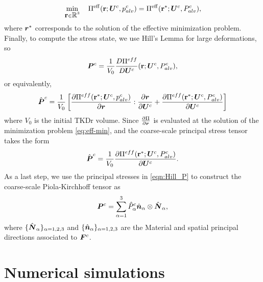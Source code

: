 \documentclass[preprint,3p,12pt,number,sort&compress]{elsarticle}
\newcommand{\pd}[2]{\frac{\partial #1}{ \partial #2}}   %
\def\mat   #1{\mbox{\bf #1}{}}
\def\vec   #1{\text{\boldmath $#1$}{}}
\def\ten   #1{\text{\boldmath $#1$}{}}
\def\R{\mbox{\(\mathbb{R}\)}}
\begin{document}
\begin{equation}
	\min \limits_{\mat r \in \R^{3}} \quad \Pi^{\rm eff} (\mat r; \ten U^c, p_{alv}^c)
	\label{eq:effmin} = \Pi^{\rm eff} (\mat r^*; \ten U^c, P_{alv}^c),
 \label{eq:eff-min}
\end{equation}
where $\vec r^{*}$ corresponds to the solution of the effective minimization problem. Finally, to compute the stress state, we use Hill's Lemma for large deformations, so
\begin{equation}
	\ten P^c =\frac{1}{V_0} \frac{D \Pi^{eff}}{D \ten U^c} (\mat r; \ten U^c, P_{alv}^c),
\end{equation}
 or equivalently,
\begin{equation}
	\hat{\ten P}^c = \frac{1}{V_0} \left[ \pd{\Pi^{eff} (\mat r^{*}; \ten U^c, p_{alv}^c) }{\vec r} : \pd{\vec r}{\ten U^c} + \pd{\Pi^{eff} (\mat r^{*}; \ten U^c, P_{alv}^c) }{\ten U^c} \right]
\end{equation}
where  $V_0$ is the initial TKDr volume. Since $\pd{\Pi}{\vec r}$ is evaluated at the solution of the minimization problem \eqref{eq:eff-min}, and the coarse-scale principal stress tensor takes the form
\begin{equation}
	\hat{\ten P}^c = \frac{1}{V_0} \pd{\Pi^{eff} (\mat r^{*}; \ten U^c, P_{alv}^c) }{\ten U^c}. \label{eqn:Hill_P}
\end{equation}
As a last step, we use the principal stresses in \eqref{eqn:Hill_P} to construct the coarse-scale Piola-Kirchhoff tensor as
\begin{equation}
    \ten P^c = \sum_{\alpha=1}^3 \hat{P}^c_{\alpha} \hat{\vec n}_{\alpha} \otimes \hat{\vec N}_{\alpha},
\end{equation}
where $\{ \hat{\vec N}_{\alpha} \}_{\alpha=1,2,3}$ and $\{ \hat{\vec n}_{\alpha} \}_{\alpha=1,2,3}$ are the Material and spatial principal directions associated to $\ten F^c$.





\section{Numerical simulations} \label{sec:numerical-simulations}
\end{document}
